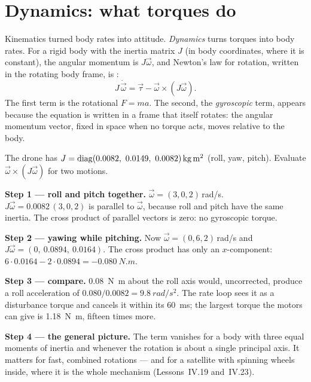 \section{Dynamics: what torques do}

Kinematics turned body rates into attitude. \emph{Dynamics} turns torques into body rates. For a rigid body with the inertia matrix $J$ (in body coordinates, where it is constant), the angular momentum is $J\vec\omega$, and Newton's law for rotation, written in the rotating body frame, is :
\begin{equation}\label{eq:H-euler-eq}
  J\,\dot{\vec\omega} = \vec\tau - \vec\omega \times (J\vec\omega) .
\end{equation}
The first term is the rotational $F = ma$. The second, the \emph{gyroscopic} term, appears because the equation is written in a frame that itself rotates: the angular momentum vector, fixed in space when no torque acts, moves relative to the body.

\begin{example}
\label{ex:H-gyro}
The drone has $J = \diag(0.0082,\ 0.0149,\ 0.0082)\,\si{kg.m^2}$ (roll, yaw, pitch). Evaluate $\vec\omega \times (J\vec\omega)$ for two motions.

\textbf{Step 1 — roll and pitch together.} $\vec\omega = (3, 0, 2)$\,rad/s. $J\vec\omega = 0.0082\,(3, 0, 2)$ is parallel to $\vec\omega$, because roll and pitch have the same inertia. The cross product of parallel vectors is zero: no gyroscopic torque.

\textbf{Step 2 — yawing while pitching.} Now $\vec\omega = (0, 6, 2)$\,rad/s and $J\vec\omega = (0,\ 0.0894,\ 0.0164)$. The cross product has only an $x$-component: $6 \cdot 0.0164 - 2 \cdot 0.0894 = \SI{-0.080}{N.m}$.

\textbf{Step 3 — compare.} \SI{0.08}{N.m} about the roll axis would, uncorrected, produce a roll acceleration of $0.080/0.0082 = \SI{9.8}{rad/s^2}$. The rate loop sees it as a disturbance torque and cancels it within its \SI{60}{ms}; the largest torque the motors can give is \SI{1.18}{N.m}, fifteen times more.

\textbf{Step 4 — the general picture.} The term vanishes for a body with three equal moments of inertia and whenever the rotation is about a single principal axis. It matters for fast, combined rotations — and for a satellite with spinning wheels inside, where it is the whole mechanism (Lessons~IV.19 and~IV.23).
\end{example}

